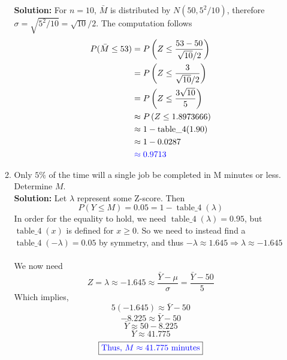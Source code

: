 \documentclass[12pt]{article}
\newcommand{\pars}[1]{\left( {#1} \right) }
\newcommand{\ybar}{\bar{Y}}
\begin{document}
\begin{enumerate}
\begin{enumerate}
        \textbf{Solution:} For $n = 10$, $\bar{M}$ is distributed by $N(50, 5^2/10)$, therefore $\sigma = \sqrt{5^2/10} = \sqrt{10}/2$. The computation follows\\
        \begin{align}
            P(\bar{M} \leq 53) &= P\pars{Z \leq \frac{53-50}{\sqrt{10}/2}} \notag\\
             &= P\pars{Z \leq \frac{3}{\sqrt{10}/2}} \notag\\
             &= P\pars{Z \leq \frac{3\sqrt{10}}{5}} \notag\\
             &\approx P\pars{Z \leq 1.8973666} \notag\\ 
             &\approx 1 - \operatorname{table\_4}(1.90) \notag\\
             &\approx 1 - 0.0287 \notag\\
             &\color{blue}\approx 0.9713 \notag
        \end{align}
        \vspace{0.15in}
        \item Only $5\%$ of the time will a single job be completed in M minutes or less. Determine $M$.
        \vspace{0.15in}\\
        \textbf{Solution:} Let $\lambda$ represent some Z-score. Then
           $$P(Y \leq M) = 0.05 = 1 - \operatorname{table\_4}(\lambda)$$
           In order for the equality to hold, we need $\operatorname{table\_4}(\lambda) = 0.95$, but $\operatorname{table\_4}(x)$ is defined for $x \geq 0$. So we need to instead find a $\operatorname{table\_4}(-\lambda) = 0.05$ by symmetry, and thus $-\lambda \approx 1.645 \Longrightarrow \lambda \approx -1.645$\\
           \\
           We now need
           $$ Z = \lambda \approx -1.645 \approx \frac{\ybar - \mu}{\sigma}
           = \frac{\ybar - 50}{5}$$
           Which implies,
           $$5(-1.645) \approx \ybar - 50$$
           $$-8.225 \approx \ybar - 50$$
           $$\ybar \approx 50 - 8.225$$
           $$\ybar \approx 41.775$$
           $$\fbox{\color{blue}Thus, $M \approx 41.775$ minutes} $$
    \end{enumerate}
\end{enumerate}
\end{document}
